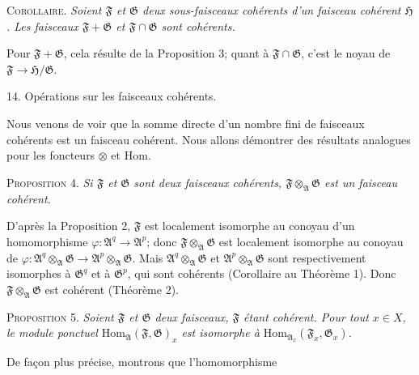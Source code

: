 \textsc{Corollaire}. \emph{Soient $\mathfrak{F}$ et $\mathfrak{G}$ deux sous-faisceaux cohérents d'un faisceau cohérent $\mathfrak{H}$. Les faisceaux $\mathfrak{F} + \mathfrak{G}$ et $\mathfrak{F} \cap \mathfrak{G}$ sont cohérents.}

Pour $\mathfrak{F} + \mathfrak{G}$, cela résulte de la Proposition 3; quant à $\mathfrak{F} \cap \mathfrak{G}$, c'est le noyau de $\mathfrak{F} \to \mathfrak{H}/\mathfrak{G}$.


14. Opérations sur les faisceaux cohérents.

Nous venons de voir que la somme directe d'un nombre fini de faisceaux cohérents est un faisceau cohérent. Nous allons démontrer des résultats analogues pour les foncteurs $\otimes$ et $\mathrm{Hom}$.

\textsc{Proposition} 4. \emph{Si $\mathfrak{F}$ et $\mathfrak{G}$ sont deux faisceaux cohérents, $\mathfrak{F} \otimes_{\mathfrak{A}} \mathfrak{G}$ est un faisceau cohérent.}

D'après la Proposition 2, $\mathfrak{F}$ est localement isomorphe au conoyau d'un homomorphisme $\varphi: \mathfrak{A}^q \to \mathfrak{A}^p$; donc $\mathfrak{F} \otimes_{\mathfrak{A}} \mathfrak{G}$ est localement isomorphe au conoyau de $\varphi: \mathfrak{A}^q \otimes_{\mathfrak{A}} \mathfrak{G} \to \mathfrak{A}^p \otimes_{\mathfrak{A}} \mathfrak{G}$. Mais $\mathfrak{A}^q \otimes_{\mathfrak{A}} \mathfrak{G}$ et $\mathfrak{A}^p \otimes_{\mathfrak{A}} \mathfrak{G}$ sont respectivement isomorphes à $\mathfrak{G}^q$ et à $\mathfrak{G}^p$, qui sont cohérents (Corollaire au Théorème 1). Donc $\mathfrak{F} \otimes_{\mathfrak{A}} \mathfrak{G}$ est cohérent (Théorème 2).

\textsc{Proposition} 5. \emph{Soient $\mathfrak{F}$ et $\mathfrak{G}$ deux faisceaux, $\mathfrak{F}$ étant cohérent. Pour tout $x \in X$, le module ponctuel $\mathrm{Hom}_{\mathfrak{A}}(\mathfrak{F}, \mathfrak{G})_x$ est isomorphe à $\mathrm{Hom}_{\mathfrak{A}_x}(\mathfrak{F}_x, \mathfrak{G}_x)$.}

De façon plus précise, montrons que l'homomorphisme

